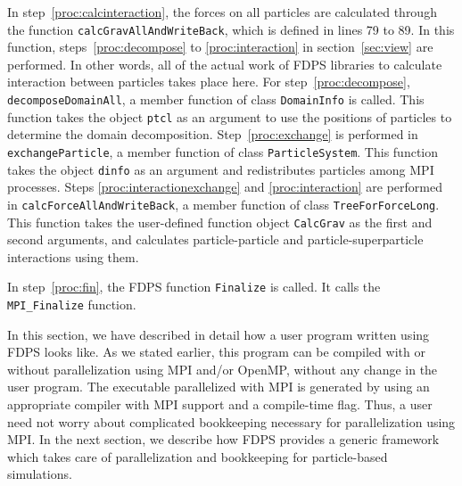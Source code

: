 In step~\ref{proc:calcinteraction}, the forces on all particles are
calculated through the function \texttt{calcGravAllAndWriteBack},
which is defined in lines 79 to 89. In this function,
steps~\ref{proc:decompose} to
\ref{proc:interaction} in section~\ref{sec:view} are performed. In
other words, all of the actual work of FDPS libraries to calculate
interaction between particles takes place here. For
step~\ref{proc:decompose}, \texttt{decomposeDomainAll}, a member
function of class \texttt{DomainInfo} is called. This function takes
the object
\texttt{ptcl} as an argument to use the positions of particles to
determine the domain decomposition.  Step~\ref{proc:exchange} is
performed in \texttt{exchangeParticle}, a member function of
class \texttt{ParticleSystem}. This function takes the
object \texttt{dinfo} as an argument and redistributes particles among
MPI processes.  Steps \ref{proc:interactionexchange}
and \ref{proc:interaction} are performed
in \texttt{calcForceAllAndWriteBack}, a member function of
class \texttt{TreeForForceLong}. This function takes the user-defined
function object \texttt{CalcGrav} as the first and second arguments,
and calculates particle-particle and particle-superparticle
interactions using them.

In step~\ref{proc:fin}, the FDPS function \texttt{Finalize} is
called. It calls the \texttt{MPI\_Finalize} function.

In this section, we have described in detail how a user program
written using FDPS looks like. As we stated earlier, this program can
be compiled with or without parallelization using MPI and/or OpenMP,
without any change in the user program. The executable parallelized
with MPI is generated by using an appropriate compiler with MPI
support and a compile-time flag.  Thus, a user need not worry about
complicated bookkeeping necessary for parallelization using MPI.
%
In the next section, we describe how FDPS provides a generic
framework which takes care of parallelization
and bookkeeping for particle-based simulations. 

